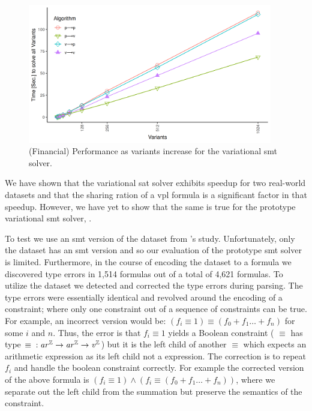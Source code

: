 ~\label{section:case-studies:vsmt}
%
\begin{figure}[h]
  \includegraphics[width=0.95\textwidth]{Plots/RQ1_Fin_Smt}
  \caption{(Financial) Performance as variants increase for the variational
    \ac{smt} solver.}%
  \label{res:rq1:vsmt}
\end{figure}
%
We have shown that the variational \ac{sat} solver exhibits speedup for two
real-world datasets and that the sharing ration of a \ac{vpl} formula is a
significant factor in that speedup. However, we have yet to show that the same
is true for the prototype variational \ac{smt} solver, \vsmt{}.

To test \vsmt{} we use an \ac{smt} version of the \fin{} dataset from \nieke{}'s
study. Unfortunately, only the \fin{} dataset has an \ac{smt} version and so our
evaluation of the prototype \ac{smt} solver is limited. Furthermore, in the
course of encoding the dataset to a \evpl{} formula we discovered type errors
in 1,514 formulas out of a total of 4,621 formulas. To utilize the dataset we
detected and corrected the type errors during parsing. The type errors were
essentially identical and revolved around the encoding of a 
constraint; where only one constraint out of a sequence of constraints can be
true. For example, an incorrect version would be: $(f_{i} \equiv{} 1) \equiv{}
(f_{0} + f_{1} \ldots{} + f_{n})$ for some $i$ and $n$. Thus, the error is that
$f_{i} \equiv 1$ yields a Boolean constraint (\ie{} $\equiv$ has type $\equiv{}
: \mathit{ar^{\mathbb{Z}}}{} \rightarrow \mathit{ar^{\mathbb{Z}}}{} \rightarrow{} \mathit{v^{\mathbb{Z}}}{}$) but it is the left child of
another $\equiv$ which expects an arithmetic expression as its left child not a
\eIL{} expression. The correction is to repeat $f_{i}$ and handle the boolean
constraint correctly. For example the corrected version of the above formula is
$(f_{i} \equiv{} 1) \wedge{} (f_{i} \equiv{} (f_{0} + f_{1} \ldots{} + f_{n}))$,
where we separate out the left child from the summation but preserve the
semantics of the  constraint.

